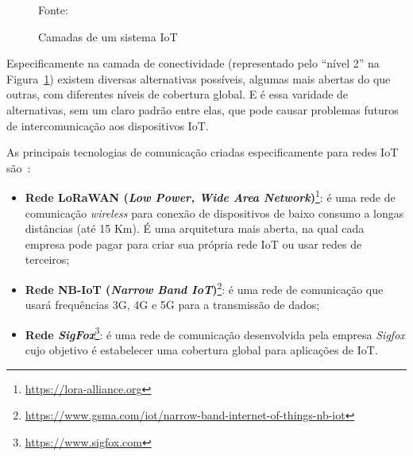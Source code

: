 \documentclass[pdftex, brazil, 12pt, twoside]{article}
\newcommand{\ingles}[1]{\textit{#1}}
\begin{document}
\begin{figure}[!h]
  \begin{center}
    \caption{Camadas de um sistema IoT}
    \label{fig:camadas-iot}
    
    \footnotesize{Fonte:~\citet{NunesLoRaSigfox2017}}
  \end{center}
\end{figure}

Especificamente na camada de conectividade (representado pelo ``nível 2'' na
Figura~\ref{fig:camadas-iot}) existem diversas alternativas possíveis,
algumas mais abertas do que outras, com diferentes níveis de cobertura global.
E é essa varidade de alternativas, sem um claro padrão entre elas,
que pode causar problemas futuros de intercomunicação aos dispositivos IoT.

As principais tecnologias de comunicação criadas especificamente
para redes IoT são~\citep{NunesLoRaSigfox2017,AlsenMcKinseyIoT2017}:

\begin{itemize}
\item \textbf{Rede LoRaWAN (\ingles{Low Power, Wide Area Network})}\footnote{\url{https://lora-alliance.org}}:
  é uma rede de comunicação \ingles{wireless} para conexão de dispositivos de
  baixo consumo a longas distâncias (até 15 Km). É uma arquitetura mais aberta,
  na qual cada empresa pode pagar para criar sua própria rede IoT ou usar redes de terceiros;
\item \textbf{Rede NB-IoT (\ingles{Narrow Band IoT})}\footnote{\url{https://www.gsma.com/iot/narrow-band-internet-of-things-nb-iot}}:
  é uma rede de comunicação que usará frequências 3G, 4G e 5G para a transmissão de dados;
\item \textbf{Rede \ingles{SigFox}}\footnote{\url{https://www.sigfox.com}}: 
  é uma rede de comunicação desenvolvida pela empresa \ingles{Sigfox} cujo objetivo é
  estabelecer uma cobertura global para aplicações de IoT.
\end{itemize}
\end{document}
